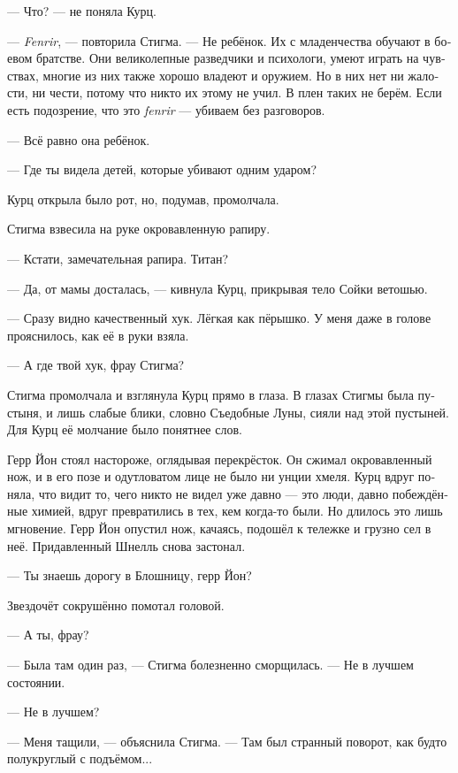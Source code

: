 \documentclass[a4paper,12pt,fleqn]{book}\usepackage{polyglossia}\setdefaultlanguage[babelshorthands=true]{russian}\setotherlanguage{english}\defaultfontfeatures{Ligatures=TeX,Mapping=tex-text}\usepackage{xcolor}\newcommand{\ml}[3]{#2}
\begin{document}
--- Что? --- не поняла Курц.

--- \textit{Fenrir}, --- повторила Стигма.
--- Не ребёнок.
Их с младенчества обучают в боевом братстве.
Они великолепные разведчики и психологи, умеют играть на чувствах, многие из них также хорошо владеют и оружием.
\ml{$0$}
{Но в них нет ни жалости, ни чести, потому что никто их этому не учил.}
{They haven't no mercy, no honour, for no one didn't teach 'em those things.}
\ml{$0$}
{В плен таких не берём.}
{Never don't capture them.}
Если есть подозрение, что это \textit{fenrir} --- убиваем без разговоров.

--- Всё равно она ребёнок.

--- Где ты видела детей, которые убивают одним ударом?

Курц открыла было рот, но, подумав, промолчала.

Стигма взвесила на руке окровавленную рапиру.

--- Кстати, замечательная рапира.
Титан?

--- Да, от мамы досталась, --- кивнула Курц, прикрывая тело Сойки ветошью.

--- Сразу видно качественный хук.
Лёгкая как пёрышко.
У меня даже в голове прояснилось, как её в руки взяла.

--- А где твой хук, фрау Стигма?

Стигма промолчала и взглянула Курц прямо в глаза.
В глазах Стигмы была пустыня, и лишь слабые блики, словно Съедобные Луны, сияли над этой пустыней.
Для Курц её молчание было понятнее слов.

Герр Йон стоял настороже, оглядывая перекрёсток.
Он сжимал окровавленный нож, и в его позе и одутловатом лице не было ни унции хмеля.
Курц вдруг поняла, что видит то, чего никто не видел уже давно --- это люди, давно побеждённые химией, вдруг превратились в тех, кем когда-то были.
Но длилось это лишь мгновение.
Герр Йон опустил нож, качаясь, подошёл к тележке и грузно сел в неё.
Придавленный Шнелль снова застонал.

--- Ты знаешь дорогу в Блошницу, герр Йон?

Звездочёт сокрушённо помотал головой.

--- А ты, фрау?

--- Была там один раз, --- Стигма болезненно сморщилась.
--- Не в лучшем состоянии.

--- Не в лучшем?

--- Меня тащили, --- объяснила Стигма.
--- Там был странный поворот, как будто полукруглый с подъёмом...
\end{document}

